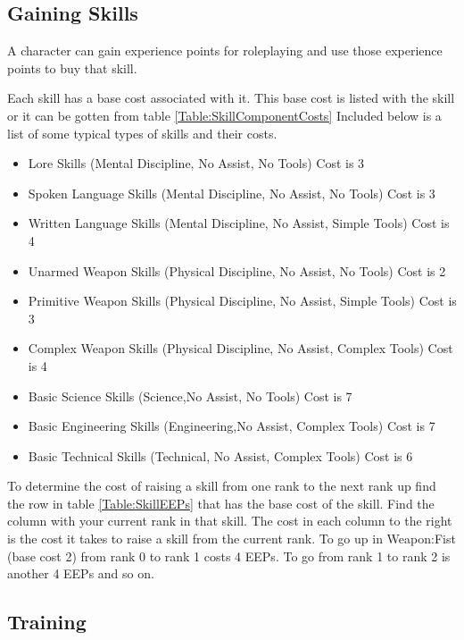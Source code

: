 \subsection{Gaining Skills}

A character can gain experience points for roleplaying and use those 
experience points to buy that skill.



Each skill has a base cost associated with it. This base cost is listed
with the skill or it can be gotten from table
\ref{Table:SkillComponentCosts} Included below is a list of some typical types of skills and their costs.

\begin{itemize}
	\item Lore Skills {\small (Mental Discipline, No Assist, No Tools)} Cost is 3
	\item Spoken Language Skills {\small (Mental Discipline, No Assist, No Tools)} Cost is 3
	\item Written Language Skills {\small (Mental Discipline, No Assist, Simple Tools)} Cost is 4
	\item Unarmed Weapon Skills {\small (Physical Discipline, No Assist, No Tools)} Cost is 2
	\item Primitive Weapon Skills {\small (Physical Discipline, No Assist, Simple Tools)} Cost is 3
	\item Complex Weapon Skills {\small (Physical Discipline, No Assist, Complex Tools)} Cost is 4
	\item Basic Science Skills {\small (Science,No Assist, No Tools)} Cost is 7
	\item Basic Engineering Skills {\small (Engineering,No Assist, Complex Tools)} Cost is 7
	\item Basic Technical Skills {\small (Technical, No Assist, Complex Tools)} Cost is 6
\end{itemize}




To determine the cost of raising a skill from one rank to the next rank
up find the row in table \ref{Table:SkillEEPs} that has the base cost of the skill.
Find the column with your current rank in that skill.
The cost in each column to the right is the cost it takes to raise a
skill from the current rank. To go up in Weapon:Fist (base cost 2) from
rank 0 to rank 1 costs 4 EEPs. To go from rank 1 to rank 2 is another 4
EEPs and so on.



\subsection{Training}

